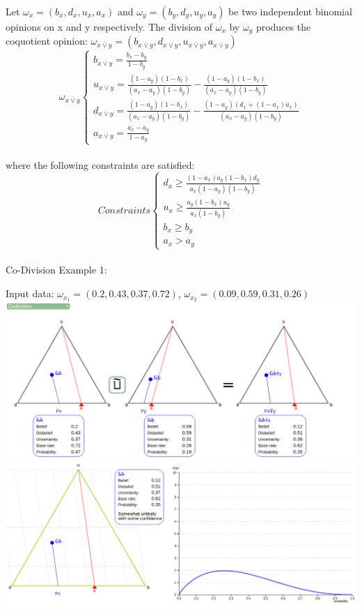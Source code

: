 \documentclass[UTF8]{article}
\newcommand{\opinion}[5]{$\omega_{#1} = (#2, #3, #4, #5)$}
\begin{document}
Let \opinion{x}{b_x}{d_x}{u_x}{a_x} and \opinion{y}{b_y}{d_y}{u_y}{a_y} be two independent binomial opinions on x and y respectively.
The division of $\omega_x$ by $\omega_y$ produces the coquotient opinion: \opinion{x \overline{\lor} y}{b_{x \overline{\lor} y}}{d_{x \overline{\lor} y}}{u_{x \overline{\lor} y}}{a_{x \overline{\lor} y}}
$$
\omega_{x \overline{\lor} y}
\begin{cases}
    b_{x \overline{\lor} y} = \frac{b_x - b_y}{1 - b_y}\\
    u_{x \overline{\lor} y} = \frac{(1 - a_y)(1 - b_x)}{(a_x - a_y)(1 - b_y)} - \frac{(1 - a_y) (1 - b_x)}{(a_x - a_y)(1 - b_y)}\\
    d_{x \overline{\lor} y} = \frac{(1 - a_y) (1 - b_x)}{(a_x - a_y)(1 - b_y)} - \frac{(1 - a_y)(d_x + (1 - a_x)u_x)}{(a_x - a_y)(1 - b_y)}\\
    a_{x \overline{\lor} y} = \frac{a_x - a_y}{1 - a_y}
\end{cases}
$$\\
where the following constraints are satisfied:
$$
Constraints
\begin{cases}
    d_x \geq \frac{(1 - a_x)a_y(1 - b_x)d_y}{a_x(1 - a_y)(1 - b_y)}\\
    u_x \geq \frac{a_y(1 - b_x) u_y}{a_x (1 - b_y)}\\
    b_x \geq b_y\\
    a_x > a_y
\end{cases}
$$\\
Co-Division Example 1:\\
\begin{center}
    Input data:
    \opinion{x_1}{0.2}{0.43}{0.37}{0.72}, 
    \opinion{x_2}{0.09}{0.59}{0.31}{0.26}\\
    \includegraphics[width=6in]{images/codiv1.png}
    \includegraphics[width=6in]{images/codiv1viz.png}
\end{center}
\end{document}
